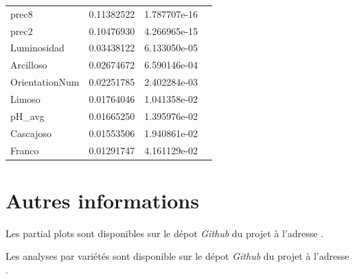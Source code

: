 \begin{table}[H]
\begin{tabular}{llll}
		prec8          & 0.11382522 & 1.787707e-16  \\
		prec2          & 0.10476930 & 4.266965e-15  \\
		Luminosidad    & 0.03438122 & 6.133050e-05  \\
		Arcilloso      & 0.02674672 & 6.590146e-04  \\
		OrientationNum & 0.02251785 & 2.402284e-03  \\
		Limoso         & 0.01764046 & 1.041358e-02  \\
		pH\_avg        & 0.01665250 & 1.395976e-02  \\
		Cascajoso      & 0.01553506 & 1.940861e-02  \\
		Franco         & 0.01291747 & 4.161129e-02 
	\end{tabular}
\end{table}















\chapter{Autres informations \label{annexeAutre}}

Les partial plots sont disponibles sur le dépot \textit{Github} du projet à l'adresse \url{}. 

Les analyses par variétés sont disponible sur le dépot \textit{Github} du projet à l'adresse \url{}. 




















